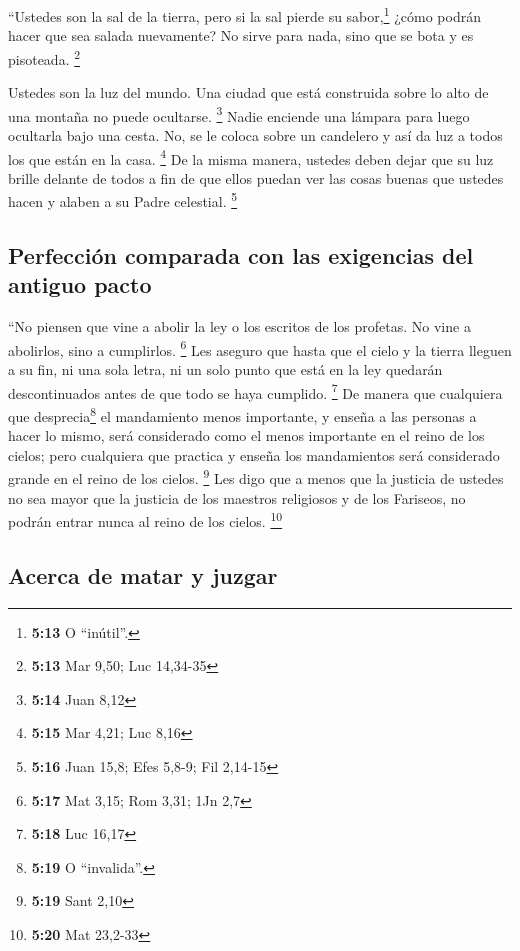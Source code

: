  ``Ustedes son la sal de la tierra, pero si la sal pierde
su sabor,\footnote{\textbf{5:13} O ``inútil''.} ¿cómo podrán hacer que
sea salada nuevamente? No sirve para nada, sino que se bota y es
pisoteada. \footnote{\textbf{5:13} Mar 9,50; Luc 14,34-35}

 Ustedes son la luz del mundo. Una ciudad que está
construida sobre lo alto de una montaña no puede ocultarse. \footnote{\textbf{5:14}
  Juan 8,12}  Nadie enciende una lámpara para luego
ocultarla bajo una cesta. No, se le coloca sobre un candelero y así da
luz a todos los que están en la casa. \footnote{\textbf{5:15} Mar 4,21;
  Luc 8,16}  De la misma manera, ustedes deben dejar que
su luz brille delante de todos a fin de que ellos puedan ver las cosas
buenas que ustedes hacen y alaben a su Padre celestial. \footnote{\textbf{5:16}
  Juan 15,8; Efes 5,8-9; Fil 2,14-15}

\hypertarget{perfecciuxf3n-comparada-con-las-exigencias-del-antiguo-pacto}{%
\subsection{Perfección comparada con las exigencias del antiguo
pacto}\label{perfecciuxf3n-comparada-con-las-exigencias-del-antiguo-pacto}}

 ``No piensen que vine a abolir la ley o los escritos de
los profetas. No vine a abolirlos, sino a cumplirlos. \footnote{\textbf{5:17}
  Mat 3,15; Rom 3,31; 1Jn 2,7}  Les aseguro que hasta que
el cielo y la tierra lleguen a su fin, ni una sola letra, ni un solo
punto que está en la ley quedarán descontinuados antes de que todo se
haya cumplido. \footnote{\textbf{5:18} Luc 16,17}  De
manera que cualquiera que desprecia\footnote{\textbf{5:19} O
  ``invalida''.} el mandamiento menos importante, y enseña a las
personas a hacer lo mismo, será considerado como el menos importante en
el reino de los cielos; pero cualquiera que practica y enseña los
mandamientos será considerado grande en el reino de los cielos.
\footnote{\textbf{5:19} Sant 2,10}  Les digo que a menos
que la justicia de ustedes no sea mayor que la justicia de los maestros
religiosos y de los Fariseos, no podrán entrar nunca al reino de los
cielos. \footnote{\textbf{5:20} Mat 23,2-33}

\hypertarget{acerca-de-matar-y-juzgar}{%
\subsection{Acerca de matar y juzgar}\label{acerca-de-matar-y-juzgar}}

